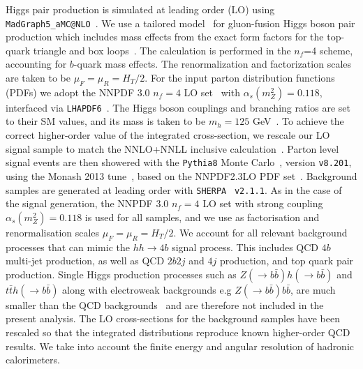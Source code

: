 \documentclass[a4paper,11pt]{article}
\begin{document}
Higgs pair production is simulated at leading order (LO) using
{\tt MadGraph5\_aMC@NLO}~\cite{Alwall:2014hca}.
%
We use a tailored  model~\cite{Maltoni:2014eza}
for gluon-fusion Higgs boson pair production
which includes mass effects
from the
exact form factors for the top-quark triangle and box
loops~\cite{Plehn:1996wb}.
%
The calculation is performed in the
$n_f$=4 scheme,  accounting for  $b$-quark mass effects. 
The renormalization and factorization
scales are taken to be $\mu_F=\mu_R=H_T/2$.
%
For the input parton distribution functions (PDFs) we 
adopt the NNPDF 3.0 $n_f=4$ LO set~\cite{Ball:2014uwa} with
$\alpha_s(m_Z^2)=0.118$,
interfaced via {\tt LHAPDF6}~\cite{Buckley:2014ana}.
%
The Higgs boson couplings
and branching ratios are set to their SM values,
and its mass is taken to be
$m_h=125$ GeV~\cite{Aad:2014aba,Khachatryan:2014jba,Aad:2015zhl}.
%
To achieve the correct higher-order value of the
integrated cross-section, we rescale our LO signal sample to match the
NNLO+NNLL
inclusive calculation~\cite{deFlorian:2013jea,deFlorian:2015moa}.
%
Parton level signal events are then showered with the {\tt Pythia8} Monte
Carlo~\cite{Sjostrand:2007gs,Sjostrand:2014zea}, version {\tt v8.201},
using the  Monash 2013 tune~\cite{Skands:2014pea},
based on the NNPDF2.3LO PDF set~\cite{Ball:2012cx,Ball:2013hta}.
%
Background samples are generated at leading order
with {\tt SHERPA}~\cite{Gleisberg:2008ta} {\tt v2.1.1}.
%
As in the case of the signal generation,
the NNPDF 3.0 $n_f = 4$ LO set with strong coupling
$\alpha_s(m_Z^2)=0.118$ is used for all samples, and
we use as
factorisation and renormalisation scales $\mu_F=\mu_R=H_T/2$.
%
We account for all relevant background
processes that can mimic the
 $hh\to 4b$ signal process.
%
This includes  QCD $4b$ multi-jet production, as well as
QCD $2b2j$ and $4j$ production, and top quark pair
production.
%
Single Higgs production processes such as $Z(\to b\bar{b})h(\to b\bar{b})$
and $t\bar{t}h(\to b\bar{b})$ along with electroweak backgrounds e.g $Z(\to b\bar{b})b\bar{b}$,
are much smaller than the QCD backgrounds~\cite{Wardrope:2014kya,deLima:2014dta}
and are therefore not included in the present analysis.
%
The LO cross-sections for
the background samples have been rescaled so that the integrated
distributions reproduce known higher-order QCD results.
%
We take into account the finite energy and angular resolution of 
hadronic calorimeters.
\end{document}
